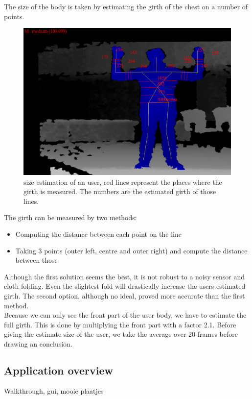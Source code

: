 \documentclass[a4paper]{article}
\begin{document}
The size of the body is taken by estimating the girth of the chest on a number of points.
\begin{figure}[htp]
\centering
\includegraphics[scale=0.3]{size_estimation.png} 
\caption{size estimation of an user, red lines represent the places where the girth is measured. The numbers are the estimated girth of those lines.}
\label{fig:size_estimation}
\end{figure}
The girth can be measured by two methods:
\begin{itemize}
\item Computing the distance between each point on the line
\item Taking 3 points (outer left, centre and outer right) and compute the distance between those
\end{itemize}
Although the first solution seems the best, it is not robust to a noisy sensor and cloth folding. Even the slightest fold will drastically increase the users estimated girth.
The second option, although no ideal, proved more accurate than the first method.
\\
Because we can only see the front part of the user body, we have to estimate the full girth. This is done by multiplying the front part with a factor 2.1.
Before giving the estimate size of the user, we take the average over 20 frames before drawing an conclusion.


\subsection{Application overview}
\label{sec:application_overview}

Walkthrough, gui, mooie plaatjes
\end{document}
